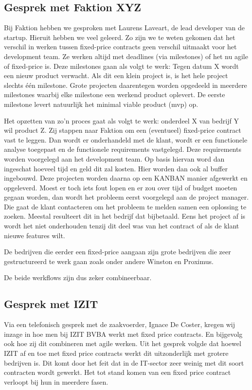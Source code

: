\documentclass{hogent-article}
\begin{document}
    \subsection{Gesprek met Faktion XYZ}
    Bij Faktion hebben we gesproken met Laurens Laveart, de lead developer van de startup. Hieruit hebben we veel geleerd. Zo zijn we te weten gekomen dat het verschil in werken tussen fixed-price contracts geen verschil uitmaakt voor het development team. Ze werken altijd met deadlines (via milestones) of het nu agile of fixed-price is. Deze milestones gaan als volgt te werk: Tegen datum X wordt een nieuw product verwacht. Als dit een klein project is, is het hele project slechts één milestone. Grote projecten daarentegen worden opgedeeld in meerdere milestones waarbij elke milestone een werkend product oplevert. De eerste milestone levert natuurlijk het minimal viable product (mvp) op.
    
    Het opzetten van zo'n proces gaat als volgt te werk: onderdeel X van bedrijf Y wil product Z. Zij stappen naar Faktion om een (eventueel) fixed-price contract vast te leggen. Dan wordt er onderhandeld met de klant, wordt er een functionele analyse toegepast en de functionele requirements vastgelegd. Deze requirements worden voorgelegd aan het development team. Op basis hiervan word dan ingeschat hoeveel tijd en geld dit zal kosten. Hier worden dan ook al buffer ingebouwd. Deze projecten worden daarna op een KANBAN manier afgewerkt en opgeleverd. Moest er toch iets fout lopen en er zou over tijd of budget moeten gegaan worden, dan wordt het probleem eerst voorgelegd aan de project manager. Die gaat de klant contacteren om het probleem te melden samen een oplossing te zoeken. Meestal resulteert dit in het bedrijf dat bijbetaald. Eens het project af is wordt het niet onderhouden tenzij dit deel was van het contract of als de klant nieuwe features wilt.
    
    De bedrijven die eerder een fixed-price aangaan zijn grote bedrijven die zeer gestructureerd te werk gaan zoals onder andere Winston en Proximus.
    
    De beide werkflows zijn dus zeker combineerbaar.
    
    \subsection{Gesprek met IZIT}
    Via een telefonisch gesprek met de zaakvoerder, Ignace De Coster, kregen wij inzage in hoe men bij IZIT BVBA werkt met fixed price contracts. En bijgevolg ook hoe zij dit combineren met agile werken. Uit het gesprek volgde dat hoewel IZIT af en toe met fixed price contracts werkt dit uitzonderlijk met grotere bedrijven is. Dit komt door het feit dat in de IT-sector zeer weinig met dit soort contracten wordt gewerkt. Het tot stand komen van een fixed price contract verloopt bij hun in meerdere fasen.
    
\end{document}
